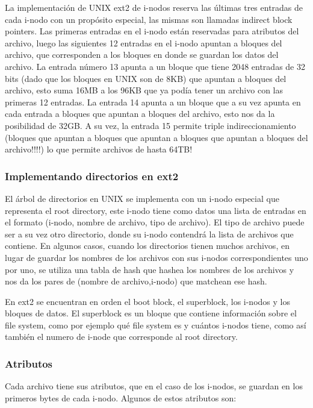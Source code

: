 \documentclass{article}
\begin{document}
La implementaci\'on de UNIX ext2 de i-nodos reserva las últimas tres entradas de cada i-nodo con un propósito especial, las mismas son llamadas indirect block pointers. Las primeras entradas en el i-nodo están reservadas para atributos del archivo, luego las siguientes 12 entradas en el i-nodo apuntan a bloques del archivo, que corresponden a los bloques en donde se guardan los datos del archivo. La entrada n\'umero 13 apunta a un bloque que tiene 2048 entradas de 32 bits (dado que los bloques en UNIX son de 8KB) que apuntan a bloques del archivo, esto suma 16MB a los 96KB que ya pod\'ia tener un archivo con las primeras 12 entradas. La entrada 14 apunta a un bloque que a su vez apunta en cada entrada a bloques que apuntan a bloques del archivo, esto nos da la posibilidad de 32GB. A su vez, la entrada 15 permite triple indireccionamiento (bloques que apuntan a bloques que apuntan a bloques que apuntan a bloques del archivo!!!!) lo que permite archivos de hasta 64TB!

\subsubsection{Implementando directorios en ext2}

El \'arbol de directorios en UNIX se implementa con un i-nodo especial que representa el root directory, este i-nodo tiene como datos una lista de entradas en el formato (i-nodo, nombre de archivo, tipo de archivo). El tipo de archivo puede ser a su vez otro directorio, donde su i-nodo contendrá la lista de archivos que contiene. En algunos casos, cuando los directorios tienen muchos archivos, en lugar de guardar los nombres de los archivos con sus i-nodos correspondientes uno por uno, se utiliza una tabla de hash que hashea los nombres de los archivos y nos da los pares de (nombre de archivo,i-nodo) que matchean ese hash.

En ext2 se encuentran en orden el boot block, el superblock, los i-nodos y los bloques de datos. El superblock es un bloque que contiene informaci\'on sobre el file system, como por ejemplo qu\'e file system es y cu\'antos i-nodos tiene, como así también el numero de i-node que corresponde al root directory.

\subsubsection{Atributos}

Cada archivo tiene sus atributos, que en el caso de los i-nodos, se guardan en los primeros bytes de cada i-nodo. Algunos de estos atributos son:
\end{document}
